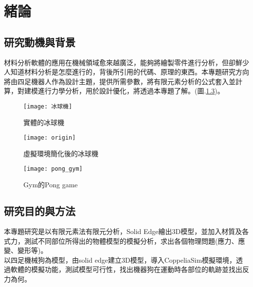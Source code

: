 \chapter{緒論}
\renewcommand{\baselinestretch}{10.0} %
\setcounter{page}{1}  %
\fontsize{14pt}{2.5pt}\sectionef
\section{研究動機與背景}
材料分析軟體的應用在機械領域愈來越廣泛，能夠將繪製零件進行分析，但卻鮮少人知道材料分析是怎麼進行的，背後所引用的代碼、原理的東西。本專題研究方向將由四足機器人作為設計主題，提供所需參數，將有限元素分析的公式套入並計算，對建模進行力學分析，用於設計優化，將透過本專題了解。(圖.\ref{fig.pong_gym})。\\

\begin{figure}[hbt!]
\begin{center}
\texttt{[image: 冰球機]}
\caption{\Large 實體的冰球機}\label{fig.冰球機}
\end{center}
\end{figure}

\begin{figure}[hbt!]
\begin{center}
\texttt{[image: origin]}
\caption{\Large 虛擬環境簡化後的冰球機}\label{fig.模擬冰球機}
\end{center}
\end{figure}

\begin{figure}[hbt!]
\begin{center}
\texttt{[image: pong\_gym]}
\caption{\Large Gym的Pong game}\label{fig.pong_gym}
\end{center}
\end{figure}
\section{研究目的與方法}
本專題研究是以有限元素法有限元分析，Solid Edge繪出3D模型，並加入材質及各式力，測試不同部位所得出的物體模型的模擬分析，求出各個物理問題(應力、應變、變形等)。\\

以四足機械狗為模型，由solid edge建立3D模型，導入CoppeliaSim模擬環境，透過軟體的模擬功能，測試模型可行性，找出機器狗在運動時各部位的軌跡並找出反力為何。\\

